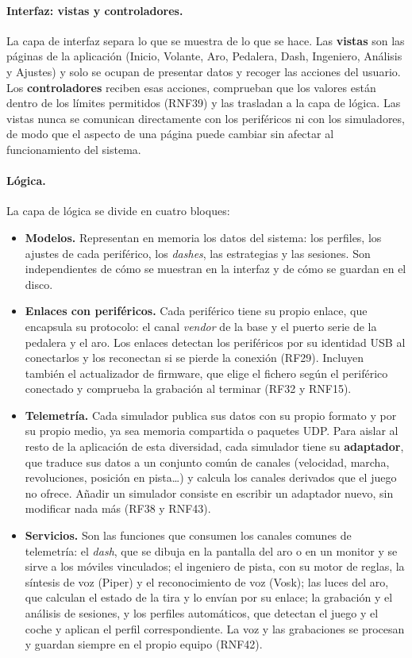 \paragraph{Interfaz: vistas y controladores.}
La capa de interfaz separa lo que se muestra de lo que se hace. Las \textbf{vistas} son las páginas de la aplicación (Inicio, Volante, Aro, Pedalera, Dash, Ingeniero, Análisis y Ajustes) y solo se ocupan de presentar datos y recoger las acciones del usuario. Los \textbf{controladores} reciben esas acciones, comprueban que los valores están dentro de los límites permitidos (RNF39) y las trasladan a la capa de lógica. Las vistas nunca se comunican directamente con los periféricos ni con los simuladores, de modo que el aspecto de una página puede cambiar sin afectar al funcionamiento del sistema.

\paragraph{Lógica.}
La capa de lógica se divide en cuatro bloques:

\begin{itemize}
	\item \textbf{Modelos.} Representan en memoria los datos del sistema: los perfiles, los ajustes de cada periférico, los \textit{dashes}, las estrategias y las sesiones. Son independientes de cómo se muestran en la interfaz y de cómo se guardan en el disco.
	\item \textbf{Enlaces con periféricos.} Cada periférico tiene su propio enlace, que encapsula su protocolo: el canal \textit{vendor} de la base y el puerto serie de la pedalera y el aro. Los enlaces detectan los periféricos por su identidad USB al conectarlos y los reconectan si se pierde la conexión (RF29). Incluyen también el actualizador de firmware, que elige el fichero según el periférico conectado y comprueba la grabación al terminar (RF32 y RNF15).
	\item \textbf{Telemetría.} Cada simulador publica sus datos con su propio formato y por su propio medio, ya sea memoria compartida o paquetes UDP. Para aislar al resto de la aplicación de esta diversidad, cada simulador tiene su \textbf{adaptador}, que traduce sus datos a un conjunto común de canales (velocidad, marcha, revoluciones, posición en pista\ldots) y calcula los canales derivados que el juego no ofrece. Añadir un simulador consiste en escribir un adaptador nuevo, sin modificar nada más (RF38 y RNF43).
	\item \textbf{Servicios.} Son las funciones que consumen los canales comunes de telemetría: el \textit{dash}, que se dibuja en la pantalla del aro o en un monitor y se sirve a los móviles vinculados; el ingeniero de pista, con su motor de reglas, la síntesis de voz (Piper) y el reconocimiento de voz (Vosk); las luces del aro, que calculan el estado de la tira y lo envían por su enlace; la grabación y el análisis de sesiones, y los perfiles automáticos, que detectan el juego y el coche y aplican el perfil correspondiente. La voz y las grabaciones se procesan y guardan siempre en el propio equipo (RNF42).
\end{itemize}

